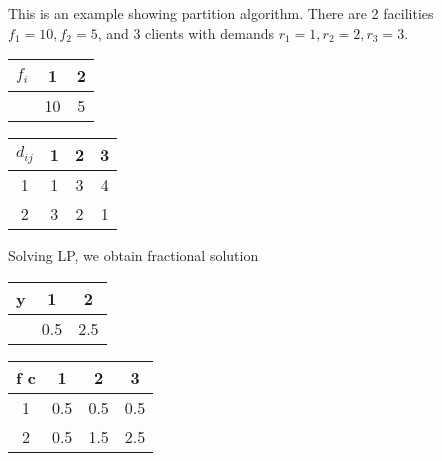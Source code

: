 \documentclass{article}
\begin{document}
This is an example showing partition algorithm. There are 2 facilities
$f_1=10, f_2 = 5$, and 3 clients with demands $r_1=1, r_2 =2, r_3=3$.

\begin{table}[ht,center]
\begin{subtable}{0.5\textwidth}
  \centering
  \begin{tabular}{c | c  c}
    $f_i$ & 1 & 2\\
    \hline
    & 10 & 5\\
  \end{tabular}
\end{subtable}
%
\begin{subtable}{0.5\textwidth}
  \centering
  \begin{tabular}{c | c  c  c}
    $d_{ij}$ & 1 & 2 & 3 \\
    \hline
    1 & 1 & 3 & 4\\
    2 & 3 & 2 & 1\\
  \end{tabular}
\end{subtable}
\end{table}

Solving LP, we obtain fractional solution
\begin{table}[ht,center]
  \begin{subtable}{0.5\textwidth}
  \centering
  \begin{tabular}{c | c  c}
    y & 1 & 2\\
    \hline
    & 0.5 & 2.5\\
  \end{tabular}
\end{subtable}
%
\begin{subtable}{0.5\textwidth}
  \centering
  \begin{tabular}{c | c c c}
    f c & 1 & 2 & 3\\
    \hline
    1 & 0.5 & 0.5 & 0.5\\
    2 & 0.5 & 1.5 & 2.5\\
  \end{tabular}
\end{subtable}
\end{table}
\end{document}
